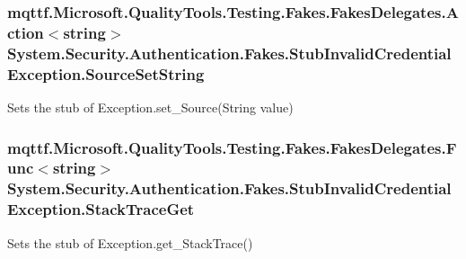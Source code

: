 \hypertarget{class_system_1_1_security_1_1_authentication_1_1_fakes_1_1_stub_invalid_credential_exception_a01b501df86db79e8ce8e16dd9599d7ea}{
\subsubsection[{Source\-Set\-String}]{\setlength{\rightskip}{0pt plus 5cm}mqttf.\-Microsoft.\-Quality\-Tools.\-Testing.\-Fakes.\-Fakes\-Delegates.\-Action$<$string$>$ System.\-Security.\-Authentication.\-Fakes.\-Stub\-Invalid\-Credential\-Exception.\-Source\-Set\-String}}\label{class_system_1_1_security_1_1_authentication_1_1_fakes_1_1_stub_invalid_credential_exception_a01b501df86db79e8ce8e16dd9599d7ea}


Sets the stub of Exception.\-set\-\_\-\-Source(\-String value)

\hypertarget{class_system_1_1_security_1_1_authentication_1_1_fakes_1_1_stub_invalid_credential_exception_a7df2545a16f6ff2d6b4566b05d72c6bd}{
\subsubsection[{Stack\-Trace\-Get}]{\setlength{\rightskip}{0pt plus 5cm}mqttf.\-Microsoft.\-Quality\-Tools.\-Testing.\-Fakes.\-Fakes\-Delegates.\-Func$<$string$>$ System.\-Security.\-Authentication.\-Fakes.\-Stub\-Invalid\-Credential\-Exception.\-Stack\-Trace\-Get}}\label{class_system_1_1_security_1_1_authentication_1_1_fakes_1_1_stub_invalid_credential_exception_a7df2545a16f6ff2d6b4566b05d72c6bd}


Sets the stub of Exception.\-get\-\_\-\-Stack\-Trace()

